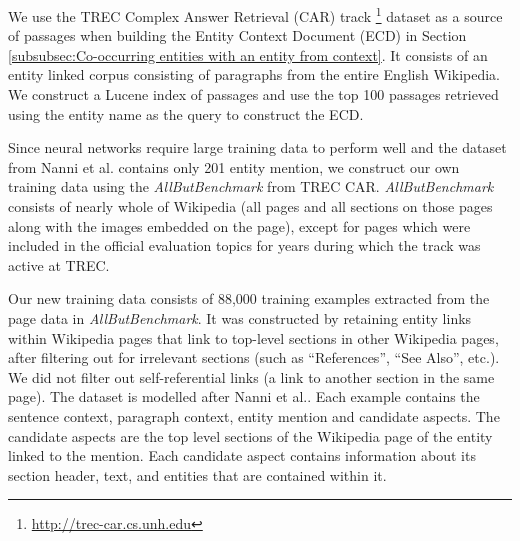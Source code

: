 We use the TREC Complex Answer Retrieval (CAR) track \cite{dietz2018trec}\footnote{\url{http://trec-car.cs.unh.edu}} dataset as a source of passages when building the Entity Context Document (ECD) in Section \ref{subsubsec:Co-occurring entities with an entity from context}. It consists of an entity linked corpus consisting of paragraphs from the entire English Wikipedia. We construct a Lucene index of passages and use the top 100 passages retrieved using the entity name as the query to construct the ECD.

Since neural networks require large training data to perform well and the dataset from Nanni et al. \cite{nanni2018entity} contains only 201 entity mention, we construct our own training data using the \textit{AllButBenchmark} from TREC CAR. \textit{AllButBenchmark} consists of nearly whole of Wikipedia (all pages and all sections on those pages along with the images embedded on the page), except for pages which were included in the official evaluation topics for years during which the track was active at TREC.

Our new training data consists of 88,000 training examples extracted from the page data in \textit{AllButBenchmark}. It was constructed by retaining entity links within Wikipedia pages that link to top-level sections in other Wikipedia pages, after filtering out for irrelevant sections (such as ``References'', ``See Also'', etc.). We did not filter out self-referential links (a link to another section in the same page). The dataset is modelled after Nanni et al.\cite{nanni2018entity}. Each example contains the sentence context, paragraph context, entity mention and candidate aspects. The candidate aspects are the top level sections of the Wikipedia page of the entity linked to the mention. Each candidate aspect contains information about its section header, text, and entities that are contained within it.


    
    


